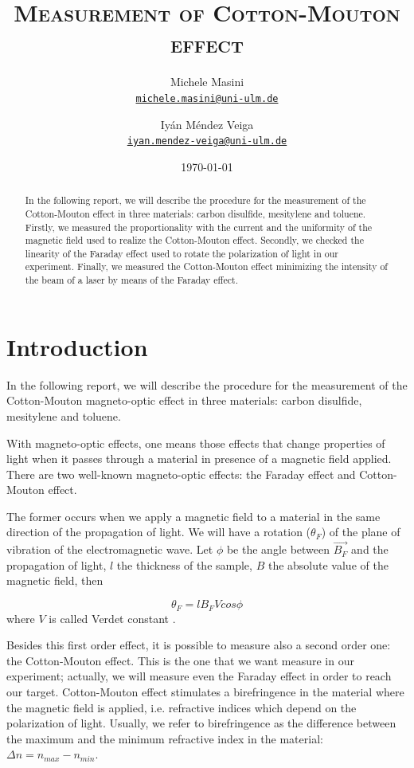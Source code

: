 \documentclass[11pt,a4paper]{article}
\title{\bfseries\textsc{Measurement of Cotton-Mouton effect}}
\author{
Michele Masini\\ \small\texttt{\href{mailto:michele.masini@uni-ulm.de}{michele.masini@uni-ulm.de}}\and
Iyán Méndez Veiga\\ \small\texttt{\href{mailto:iyan.mendez-veiga@uni-ulm.de}{iyan.mendez-veiga@uni-ulm.de}}
}
\date{\today}
\begin{document}
\maketitle

\begin{abstract}
In the following report, we will describe the procedure for the measurement of the Cotton-Mouton effect in three materials: carbon disulfide, mesitylene and toluene. Firstly, we measured the proportionality with the current and the uniformity of the magnetic field used to realize the Cotton-Mouton effect. Secondly, we checked the linearity of the Faraday effect used to rotate the polarization of light in our experiment. Finally, we measured the Cotton-Mouton effect minimizing the intensity of the beam of a laser by means of the Faraday effect.
\end{abstract}

\vspace{1.5cm}

\section{Introduction}

\vspace{.5cm}
In the following report, we will describe the procedure for the measurement of the Cotton-Mouton magneto-optic effect in three materials: carbon disulfide, mesitylene and toluene.

With magneto-optic effects, one means those effects that change properties of light when it passes through a material in presence of a magnetic field applied. There are two well-known magneto-optic effects: the Faraday effect and Cotton-Mouton effect.
	
The former occurs when we apply a magnetic field to a material in the same direction of the propagation of light. We will have a rotation ($\theta_F$) of the plane of vibration of the electromagnetic wave. Let $\phi$ be the angle between $\vec{B_F}$ and the propagation of light, $l$ the thickness of the sample, $B$ the absolute value of the magnetic field, then

\begin{equation}\label{verd}
\theta_F=lB_F Vcos\phi
\end{equation}
where $V$ is called Verdet constant \cite{cappelli2003cotton}. 

Besides this first order effect, it is possible to measure also a second order one: the Cotton-Mouton effect. This is the one that we want measure in our experiment; actually, we will measure even the Faraday effect in order to reach our target. Cotton-Mouton effect stimulates a birefringence in the material where the magnetic field is applied, i.e. refractive indices which depend on the polarization of light. Usually, we refer to birefringence as the difference between the maximum and the minimum refractive index in the material: $\Delta n=n_{max}-n_{min}$.
\end{document}
